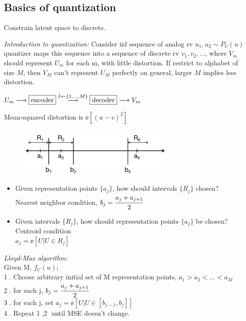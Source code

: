 \documentclass[12pt,a4paper]{article}
\begin{document}
\subsection{Basics of quantization}
Constrain latent space to discrete. 

\textit{Introduction to quantization:} 
Consider iid sequence of analog rv $u_1, u_2\sim P_U(u)$ quantizer maps this sequence into a sequence of discrete rv $v_1,v_2,...$, where $V_m$ should represent $U_m$ for each m, with little distortion. 
If restrict to alphabet of size $M$, then $V_M$ can't represent $U_M$ perfectly on general, larger $M$ implies less distortion. 

$U_m\longrightarrow \fbox{encoder} \overset{I\leftarrow\{1,...,M\}}{\longrightarrow} \fbox{decoder} \longrightarrow V_m$

Mean-squared distortion is $\ee[(u-v)^2]$

\vspace{2cm}
\begin{figure}[!ht]
    \centering
    \includegraphics[width=0.7\textwidth]{fig/vae_quant.png}
\end{figure}

\begin{itemize}
\item Given representation points $\{a_j\}$, how should intervals $\{R_j\}$ chosen? \\
Nearest neighbor condition, $b_j=\cfrac{a_j+a_{j+1}}{2}$
\item Given intervals $\{R_j\}$, how should representation points $\{a_j\}$ be chosen? \\
Centroid condition\\
$a_j=\ee[U|U\in R_j]$
\end{itemize}

\textit{Lloyd-Max algorithm:}\\
Given M, $f_U(u)$;\\
\textcircled{1}. Choose arbitrary initial set of M representation points, $a_1>a_2<...<a_M$\\
\textcircled{2}. for each j, $b_j=\cfrac{a_j+a_{j+1}}{2}$\\
\textcircled{3}. for each j, set $a_j=\ee[U|U\in [b_{j-1}, b_j]]$\\
\textcircled{4}. Repeat \textcircled{1},\textcircled{2} until MSE doesn't change.
\end{document}

